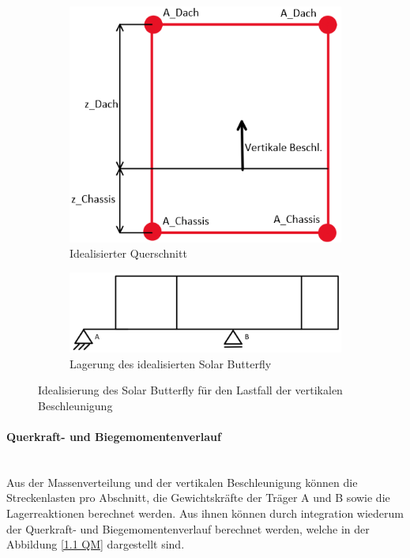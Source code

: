   \begin{figure}[!ht]
    \centering
      \begin{subfigure}{.4\textwidth}
        \centering
        \includegraphics[width=\linewidth]{04_figures/1.1 Querschnitt.png}
        \caption{Idealisierter Querschnitt}
        \label{1.1 Idealisierter Querschnitt}
      \end{subfigure}%
      \begin{subfigure}{.6\textwidth}
        \centering
        \includegraphics[width=\linewidth]{04_figures/1.1 Lagerung.png}
        \caption{Lagerung des idealisierten Solar Butterfly}
        \label{1.1 Lagerung}
      \end{subfigure}%
    \caption{Idealisierung des Solar Butterfly für den Lastfall der vertikalen Beschleunigung}
  \label{1.1 Idealisierung}
  \end{figure}

  \paragraph{Querkraft- und Biegemomentenverlauf}\mbox{}\\
  Aus der Massenverteilung und der vertikalen Beschleunigung können die Streckenlasten pro Abschnitt, die Gewichtskräfte der Träger A und B sowie die Lagerreaktionen berechnet werden. Aus ihnen können durch integration wiederum der Querkraft- und Biegemomentenverlauf berechnet werden, welche in der Abbildung \ref{1.1 QM} dargestellt sind.

